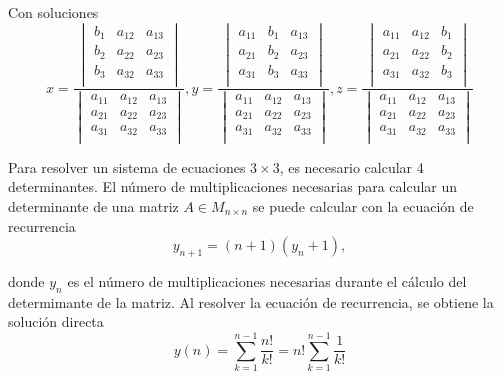 Con soluciones
\begin{equation*}
    x = \frac{
    \begin{vmatrix}
        b_1 & a_{12} & a_{13}\\
        b_2 & a_{22} & a_{23}\\
        b_3 & a_{32} & a_{33}\\
    \end{vmatrix}}{
    \begin{vmatrix}
        a_{11} & a_{12} & a_{13}\\
        a_{21} & a_{22} & a_{23}\\
        a_{31} & a_{32} & a_{33}\\
    \end{vmatrix}},
    y = \frac{
    \begin{vmatrix}
        a_{11} & b_1 & a_{13}\\
        a_{21} & b_2 & a_{23}\\
        a_{31} & b_3 & a_{33}\\
    \end{vmatrix}}{
    \begin{vmatrix}
        a_{11} & a_{12} & a_{13}\\
        a_{21} & a_{22} & a_{23}\\
        a_{31} & a_{32} & a_{33}\\
    \end{vmatrix}},
    z = \frac{
    \begin{vmatrix}
        a_{11} & a_{12} & b_1\\
        a_{21} & a_{22} & b_2\\
        a_{31} & a_{32} & b_3\\
    \end{vmatrix}}{
    \begin{vmatrix}
        a_{11} & a_{12} & a_{13}\\
        a_{21} & a_{22} & a_{23}\\
        a_{31} & a_{32} & a_{33}\\
    \end{vmatrix}}
\end{equation*}

Para resolver un sistema de ecuaciones $3 \times 3$, es necesario calcular 4
determinantes. El número de multiplicaciones necesarias para calcular un
determinante de una matriz $A \in M_{n \times n}$ se puede calcular con la
ecuación de recurrencia
\[ y_{n+1} = (n+1)(y_n + 1), \]

\noindent donde $y_n$ es el número de multiplicaciones necesarias durante el
cálculo del determimante de la matriz. Al resolver la ecuación de recurrencia,
se obtiene la solución directa
\[
    y(n) = \sum_{k=1}^{n-1} \frac{n!}{k!} = n! \sum_{k=1}^{n-1} \frac{1}{k!}
\]

